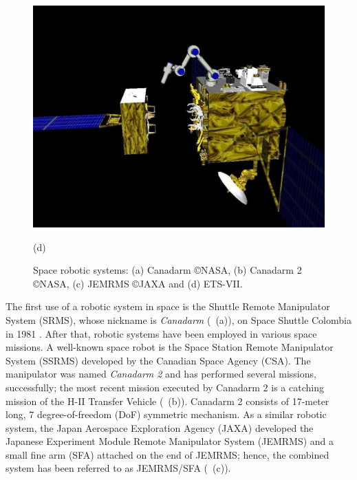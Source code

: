 \begin{figure}[t]
\begin{minipage}{0.45\linewidth}
  \end{minipage}
  \hspace{2mm}
  \begin{minipage}{0.45\linewidth}
    \centering
    \includegraphics[width=1.0\linewidth]{fig/chapter1/ETSVII.eps}
    \footnotesize\par{(d)}
  \end{minipage}
  \caption{Space robotic systems: (a) Canadarm \copyright NASA, (b) Canadarm 2 \copyright NASA, 
    (c) JEMRMS \copyright JAXA and (d) ETS-VII.}
  \label{fig:SR}
\end{figure}
%

The first use of a robotic system in space is the Shuttle Remote Manipulator System (SRMS),
whose nickname is \textit{Canadarm} (~(a)),
on Space Shuttle Colombia in 1981 \cite{Flores-Abad2014}.
After that, robotic systems have been employed in various space missions.
A well-known space robot is the Space Station Remote Manipulator System (SSRMS)
developed by the Canadian Space Agency (CSA).
The manipulator was named \textit{Canadarm 2} and has performed several missions, successfully;
the most recent mission executed by Canadarm 2 is a catching mission of the H-II Transfer Vehicle (~(b)).
Canadarm 2 consists of 17-meter long, 7 degree-of-freedom (DoF) symmetric mechanism.
As a similar robotic system,
the Japan Aerospace Exploration Agency (JAXA) developed the Japanese Experiment Module
Remote Manipulator System (JEMRMS) and a small fine arm (SFA) attached on the end of JEMRMS;
hence, the combined system has been referred to as JEMRMS/SFA (~(c)).

